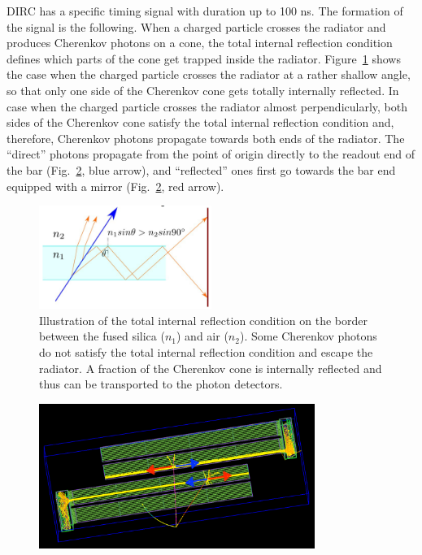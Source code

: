 DIRC has a specific timing signal with duration up to 100 ns. The formation of the signal is the following. When a charged particle crosses the radiator and produces Cherenkov photons on a cone, the total internal reflection condition defines which parts of the cone get trapped inside the radiator. Figure~\ref{pic:bas2} shows the case when the charged particle crosses the radiator at a rather shallow angle, so that only one side of the Cherenkov cone gets totally internally reflected. In case when the charged particle crosses the radiator almost perpendicularly, both sides of the Cherenkov cone satisfy the total internal reflection condition and, therefore, Cherenkov photons propagate towards both ends of the radiator. The ``direct'' photons propagate from the point of origin directly to the readout end of the bar (Fig.~\ref{pic:dir_ref}, blue arrow), and ``reflected'' ones first go towards the bar end equipped with a mirror (Fig.~\ref{pic:dir_ref}, red arrow). 

\begin{figure}
\centering
\includegraphics[width=0.5\textwidth]{pics/bas2.png}
\caption{\label{pic:bas2}
Illustration of the total internal reflection condition on the border between the fused silica ($n_{1}$) and air ($n_{2}$). Some Cherenkov photons do not satisfy the total internal reflection condition and escape the radiator. A fraction of the Cherenkov cone is internally reflected and thus can be transported to the photon detectors.
}
\end{figure}

\begin{figure}
\centering
\includegraphics[width=0.8\textwidth]{pics/dir_ref.png}
\caption{\label{pic:dir_ref}}

\end{figure}

